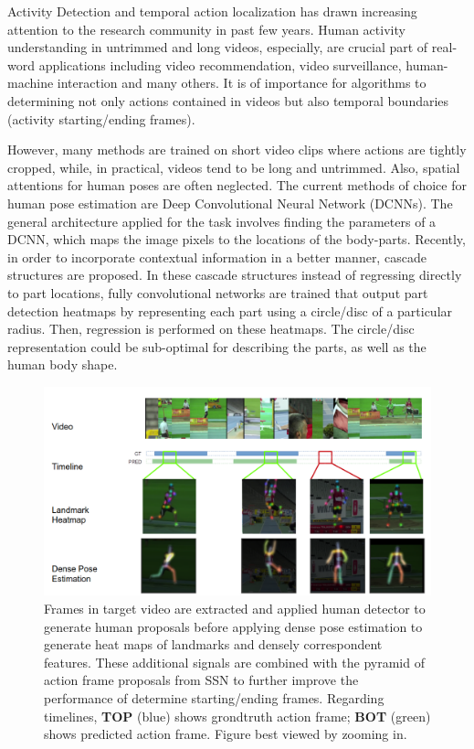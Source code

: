 Activity Detection and temporal action localization \cite{zhao2017temporal,xu2017r,shou2017cdc,simonyan2014two,jiang2014thumos,caba2015activitynet,shou2016temporal} has drawn increasing attention to the research community in past few years. Human activity understanding in untrimmed and long videos, especially, are crucial part of real-word applications including video recommendation, video surveillance, human-machine interaction and many others. It is of importance for algorithms to determining not only actions contained in videos but also temporal boundaries (activity starting/ending frames).

However, many methods are trained on short video clips where actions are tightly cropped, while, in practical, videos tend to be long and untrimmed. Also, spatial attentions for human poses are often neglected. The current methods of choice for human pose estimation are Deep Convolutional Neural Network (DCNNs). The general architecture applied for the task involves finding the parameters of a DCNN, which maps the image pixels to the locations of the body-parts. Recently, in order to incorporate contextual information in a better manner, cascade structures are proposed. In these cascade structures instead of regressing directly to part locations, fully convolutional networks are trained that output part detection heatmaps by representing each part using a circle/disc of a particular radius. Then, regression is performed on these heatmaps. The circle/disc representation could be sub-optimal for describing the parts, as well as the human body shape.

\begin{figure}[t!]
\begin{center}
   \includegraphics[width=1\linewidth ]{resources/Human_Poses/timeline}
\end{center}
   \caption{ Frames in target video are extracted and applied human detector to generate human proposals before applying dense pose estimation to generate heat maps of landmarks and densely correspondent features. These additional signals are combined with the pyramid of action frame proposals from SSN to further improve the performance of determine starting/ending frames. Regarding timelines, \textbf{TOP} (blue) shows grondtruth action frame; \textbf{BOT} (green) shows predicted action frame. Figure best viewed by zooming in.}
\label{fig:FrontPage}
\end{figure}

